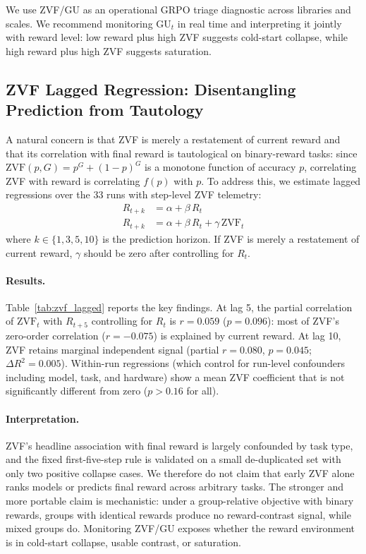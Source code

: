 \documentclass{article}
\begin{document}
We use ZVF/GU as an operational GRPO triage diagnostic across libraries and
scales. We recommend monitoring $\mathrm{GU}_t$ in real time and interpreting
it jointly with reward level: low reward plus high ZVF suggests cold-start
collapse, while high reward plus high ZVF suggests saturation.

\subsection{ZVF Lagged Regression: Disentangling Prediction from Tautology}
\label{sec:zvf-lagged}

A natural concern is that ZVF is merely a restatement of current reward and
that its correlation with final reward is tautological on binary-reward tasks:
since $\mathrm{ZVF}(p, G) = p^G + (1-p)^G$ is a
monotone function of accuracy $p$, correlating ZVF with reward is
correlating $f(p)$ with $p$.  To address this, we estimate lagged regressions
over the 33 runs with step-level ZVF telemetry:
\begin{align}
  R_{t+k} &= \alpha + \beta \, R_t \tag{M1} \\
  R_{t+k} &= \alpha + \beta \, R_t + \gamma \, \mathrm{ZVF}_t \tag{M2}
\end{align}
where $k \in \{1, 3, 5, 10\}$ is the prediction horizon.
If ZVF is merely a restatement of current reward, $\gamma$ should be zero after
controlling for $R_t$.

\paragraph{Results.}
Table~\ref{tab:zvf_lagged} reports the key findings.  At lag 5, the partial
correlation of $\mathrm{ZVF}_t$ with $R_{t+5}$ controlling for $R_t$ is
$r{=}0.059$ ($p{=}0.096$): most of ZVF's zero-order correlation ($r{=}{-}0.075$)
is explained by current reward.  At lag 10, ZVF retains marginal independent
signal (partial $r{=}0.080$, $p{=}0.045$; $\Delta R^2{=}0.005$).  Within-run
regressions (which control for run-level confounders including model, task, and
hardware) show a mean ZVF coefficient that is not significantly different from
zero ($p{>}0.16$ for all).

\paragraph{Interpretation.}
ZVF's headline association with final reward is largely confounded by task type,
and the fixed first-five-step rule is validated on a small de-duplicated set with only two
positive collapse cases.  We therefore do not claim that early ZVF alone ranks
models or predicts final reward across arbitrary tasks.  The stronger and more
portable claim is mechanistic: under a group-relative objective with binary
rewards, groups with identical rewards produce no reward-contrast signal, while
mixed groups do.  Monitoring ZVF/GU exposes whether the reward environment is in
cold-start collapse, usable contrast, or saturation.
\end{document}
